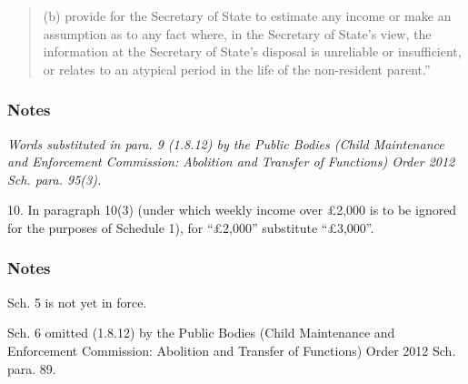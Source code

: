 \documentclass[a4paper]{article}
\newcommand\amendment[1]{\subsubsection*{Notes}{\itshape\frenchspacing\footnotesize #1 \par}}
\begin{document}
{\begin{quotation}
\begin{enumerate}
(b) provide for the Secretary of State to estimate any income or make an assumption as to any fact where, in the Secretary of State's view, the information at the Secretary of State's disposal is unreliable or insufficient, or relates to an atypical period in the life of the non-resident parent.”
\end{enumerate}
\end{quotation}

\amendment{
Words substituted in para. 9 (1.8.12) by the Public Bodies (Child Maintenance and Enforcement Commission: Abolition and Transfer of Functions) Order 2012 Sch. para. 95(3).


}

\medskip

10. In paragraph 10(3) (under which weekly income over £2,000 is to be ignored for the purposes of Schedule 1), for “£2,000” substitute “£3,000”.

\amendment{

Sch. 5 is not yet in force. %

\medskip


Sch. 6 omitted (1.8.12) by the Public Bodies (Child Maintenance and Enforcement Commission: Abolition and Transfer of Functions) Order 2012 Sch. para. 89.

}
}
\end{document}
